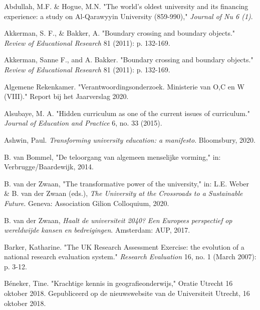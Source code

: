 \documentclass[smallauthor, chapterhaspagenum, nochapterinheader, pagenuminheader,  bigchapnum,medium2, tocpages,  garamond, titleinheader]{jote-book}
\begin{document}
	\begin{references}


		Abdullah, M.F. \& Hogue, M.N. "The world's oldest university and its financing experience: a study on Al-Qarawyyin University (859-990)," \emph{Journal of Nu 6 (1)}.

		Akkerman, S. F., \& Bakker, A. "Boundary crossing and boundary objects." \emph{Review of Educational Research} 81 (2011): p. 132-169.



		Akkerman, Sanne F., and A. Bakker. "Boundary crossing and boundary objects." \emph{Review of Educational Research} 81 (2011): p. 132-169.



		Algemene Rekenkamer. "Verantwoordingsonderzoek. Ministerie van O,C en W (VIII)." Report bij het Jaarverslag 2020.



		Alsubaye, M. A. "Hidden curriculum as one of the current issues of curriculum." \emph{Journal of Education and Practice} 6, no. 33 (2015).



		Ashwin, Paul. \emph{Transforming university education: a manifesto}. Bloomsbury, 2020.



		B. van Bommel, "De teloorgang van algemeen menselijke vorming," in: Verbrugge/Baardewijk, 2014.



		B. van der Zwaan, "The transformative power of the university," in: L.E. Weber \& B. van der Zwaan (eds.), \emph{The University at the Crossroads to a Sustainable Future}. Geneva: Association Gilion Colloquium, 2020.



		B. van der Zwaan, \emph{Haalt}\emph{ de }\emph{universiteit}\emph{ 2040? }\emph{Een}\emph{ }\emph{Europees}\emph{ }\emph{perspectief}\emph{ op }\emph{wereldwijde}\emph{ }\emph{kansen}\emph{ }\emph{en}\emph{ }\emph{bedreigingen}. Amsterdam: AUP, 2017.



		Barker, Katharine. "The UK Research Assessment Exercise: the evolution of a national research evaluation system." \emph{Research Evaluation} 16, no. 1 (March 2007): p. 3-12.



		Béneker, Tine. "Krachtige kennis in geografieonderwijs," Oratie Utrecht 16 oktober 2018. Gepubliceerd op de nieuwswebsite van de Universiteit Utrecht, 16 oktober 2018.




\end{references}
\end{document}
